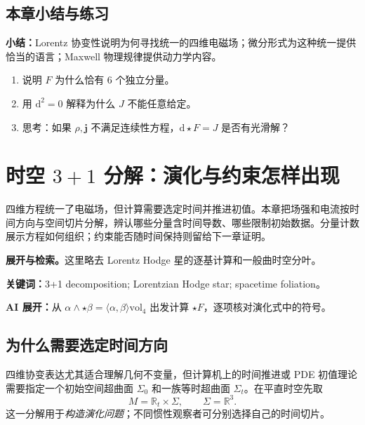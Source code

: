 \documentclass[UTF8,11pt,openany]{ctexbook}
\numberwithin{equation}{chapter}
\theoremstyle{definition}
\theoremstyle{remark}
\newcommand{\dd}{\mathrm d}
\newcommand{\RR}{\mathbb R}
\newcommand{\vol}{\mathrm{vol}}
\newcommand{\studyroute}[3]{%
  \par\smallskip\noindent\textbf{展开与检索。}#1\par
  \noindent\textbf{关键词：}#2。\par
  \noindent\textbf{AI 展开：}#3\par
}
\begin{document}
\section{本章小结与练习}
\noindent\textbf{小结：}Lorentz 协变性说明为何寻找统一的四维电磁场；微分形式为这种统一提供恰当的语言；Maxwell 物理规律提供动力学内容。
\begin{enumerate}
\item 说明 $F$ 为什么恰有 6 个独立分量。
\item 用 $\dd^2=0$ 解释为什么 $J$ 不能任意给定。
\item 思考：如果 $\rho,\bm j$ 不满足连续性方程，$\dd\star F=J$ 是否有光滑解？
\end{enumerate}

\chapter{时空 \texorpdfstring{$3+1$}{3+1} 分解：演化与约束怎样出现}
\label{ch:31}
\begin{chaptersummary}
四维方程统一了电磁场，但计算需要选定时间并推进初值。本章把场强和电流按时间方向与空间切片分解，辨认哪些分量含时间导数、哪些限制初始数据。分量计数展示方程如何组织；约束能否随时间保持则留给下一章证明。
\end{chaptersummary}
\studyroute{这里略去 Lorentz Hodge 星的逐基计算和一般曲时空分叶。}{3+1 decomposition; Lorentzian Hodge star; spacetime foliation}{从 $\alpha\wedge\star\beta=\langle\alpha,\beta\rangle\vol_4$ 出发计算 $\star F$，逐项核对演化式中的符号。}
\section{为什么需要选定时间方向}
四维协变表达尤其适合理解几何不变量，但计算机上的时间推进或 PDE 初值理论需要指定一个初始空间超曲面 $\Sigma_0$ 和一族等时超曲面 $\Sigma_t$。在平直时空先取
\begin{equation}
M=\RR_t\times\Sigma,\qquad \Sigma=\RR^3.
\end{equation}
这一分解用于\emph{构造演化问题}；不同惯性观察者可分别选择自己的时间切片。
\end{document}
